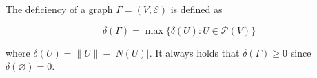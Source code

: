 The deficiency of a graph $\Gamma = (V, \mathcal{E})$ is defined as

$$\delta(\Gamma) = \max\{\delta(U) : U \in \mathcal{P}(V)\}$$

where $\delta(U) = \|U\| - |N(U)|$. It always holds that $\delta(\Gamma) \geq 0$ since $\delta(\varnothing) = 0$.

